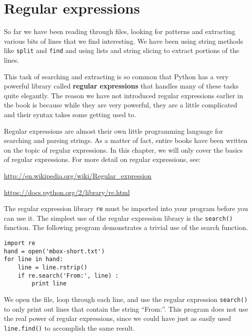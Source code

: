 
\chapter{Regular expressions}

So far we have been reading through files, looking for patterns and extracting various
bits of lines that we find interesting.  We have been using string methods like {\tt split}
and {\tt find} and using lists and string slicing to extract portions of the lines.

This task of searching and extracting is so common that Python has a very powerful library
called {\bf regular expressions} that handles many of these tasks quite elegantly.  The
reason we have not introduced regular expressions earlier in the book is because while they
are very powerful, they are a little complicated and their syntax takes some getting used to. 

Regular expressions are almost their own little programming language for searching and parsing
strings.  As a matter of fact, entire books have been written on the topic of regular expressions.
In this chapter, we will only cover the basics of regular expressions.  For more detail on regular
expressions, see:

\url{http://en.wikipedia.org/wiki/Regular_expression}

\url{https://docs.python.org/2/library/re.html}

The regular expression library {\tt re} must be imported into your program before you can use it.
The simplest use of the regular expression library is the {\tt search()} function.  The following
program demonstrates a trivial use of the search function.

\beforeverb
\begin{verbatim}
import re
hand = open('mbox-short.txt')
for line in hand:
    line = line.rstrip()
    if re.search('From:', line) :
        print line
\end{verbatim}
\afterverb
%
We open the file, loop through each line, and use the regular expression {\tt search()} to
only print out lines that contain the string ``From:''.   This program does not use the real
power of regular expressions, since we could have just as easily used {\tt line.find()} to
accomplish the same result.

